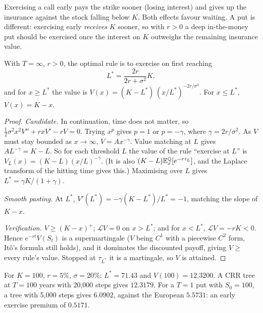 \begin{intuition}
Exercising a call early pays the strike sooner (losing interest) and gives up the insurance against the stock falling below $K$. Both effects favour waiting. A put is different: exercising early \emph{receives} $K$ sooner, so with $r>0$ a deep in-the-money put should be exercised once the interest on $K$ outweighs the remaining insurance value.
\end{intuition}

\begin{theorem}\label{thm:perp}
With $T=\infty$, $r>0$, the optimal rule is to exercise on first reaching
\[
L^*=\frac{2r}{2r+\sigma^2}K,
\]
and for $x\ge L^*$ the value is $V(x)=(K-L^*)\,(x/L^*)^{-2r/\sigma^2}$. For $x\le L^*$, $V(x)=K-x$.
\end{theorem}
\begin{proof}
\emph{Candidate.} In continuation, time does not matter, so $\tfrac12\sigma^2x^2V''+rxV'-rV=0$. Trying $x^p$ gives $p=1$ or $p=-\gamma$, where $\gamma=2r/\sigma^2$. As $V$ must stay bounded as $x\to\infty$, $V=Ax^{-\gamma}$. Value matching at $L$ gives $AL^{-\gamma}=K-L$. So for each threshold $L$ the value of the rule ``exercise at $L$'' is $V_L(x)=(K-L)(x/L)^{-\gamma}$. (It is also $(K-L)\mathbb{E}^{\mathbb{Q}}_x[e^{-r\tau_L}]$, and the Laplace transform of the hitting time gives this.) Maximising over $L$ gives $L^*=\gamma K/(1+\gamma)$.

\emph{Smooth pasting.} At $L^*$, $V'(L^*)=-\gamma(K-L^*)/L^*=-1$, matching the slope of $K-x$.

\emph{Verification.} $V\ge(K-x)^+$; $\mathcal{L}V=0$ on $x>L^*$; and for $x<L^*$, $\mathcal{L}V=-rK<0$. Hence $e^{-rt}V(S_t)$ is a supermartingale ($V$ being $C^1$ with a piecewise $C^2$ form, It\^o's formula still holds), and it dominates the discounted payoff, giving $V\ge$ every rule's value. Stopped at $\tau_{L^*}$ it is a martingale, so $V$ is attained.
\end{proof}

\begin{numcheck}
For $K=100$, $r=5\%$, $\sigma=20\%$: $L^*=71.43$ and $V(100)=12.3200$. A CRR tree at $T=100$ years with 20{,}000 steps gives $12.3179$. For a $T=1$ put with $S_0=100$, a tree with 5{,}000 steps gives $6.0902$, against the European $5.5731$: an early exercise premium of $0.5171$.
\end{numcheck}

